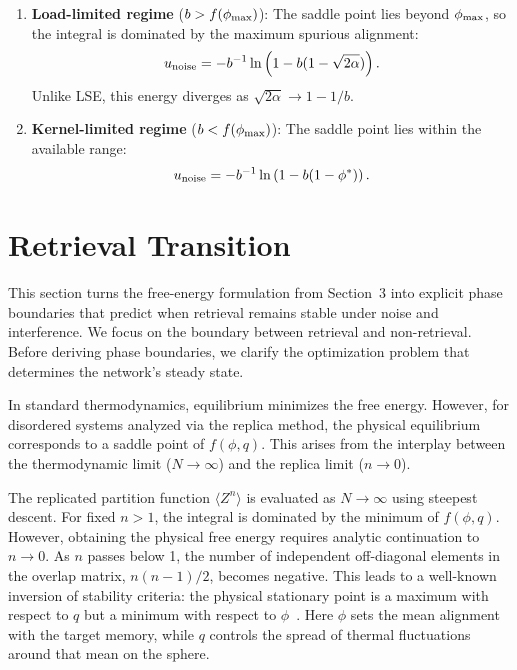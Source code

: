 \documentclass{article}
\theoremstyle{plain}
\theoremstyle{definition}
\theoremstyle{remark}
\begin{document}
\begin{enumerate}
    \item \textbf{Load-limited regime} ($b > f(\phi_{\rm max})$): The saddle point lies beyond $\phi_{\rm max}$, so the integral is dominated by the maximum spurious alignment:
    \begin{equation}
        u_{\rm noise} = -b^{-1} \ln \left( 1 - b(1 - \sqrt{2\alpha}) \right).
    \end{equation}
    Unlike LSE, this energy diverges as $\sqrt{2\alpha} \to 1 - 1/b$.

    \item \textbf{Kernel-limited regime} ($b < f(\phi_{\rm max})$): The saddle point lies within the available range:
    \begin{equation}
        u_{\rm noise} = -b^{-1} \ln \left( 1 - b(1 - \phi^*) \right).
    \end{equation}
\end{enumerate}


\section{Retrieval Transition}\label{sec:transition}

This section turns the free-energy formulation from Section~3 into explicit phase boundaries that predict when retrieval remains stable under noise and interference. We focus on the boundary between retrieval and non-retrieval. Before deriving phase boundaries, we clarify the optimization problem that determines the network's steady state. 

In standard thermodynamics, equilibrium minimizes the free energy. However, for disordered systems analyzed via the replica method, the physical equilibrium corresponds to a saddle point of $f(\phi, q)$. This arises from the interplay between the thermodynamic limit ($N \to \infty$) and the replica limit ($n \to 0$).

The replicated partition function $\langle Z^n \rangle$ is evaluated as $N \to \infty$ using steepest descent. For fixed $n > 1$, the integral is dominated by the minimum of $f(\phi, q)$. However, obtaining the physical free energy requires analytic continuation to $n \to 0$. As $n$ passes below 1, the number of independent off-diagonal elements in the overlap matrix, $n(n-1)/2$, becomes negative. This leads to a well-known inversion of stability criteria: the physical stationary point is a maximum with respect to $q$ but a minimum with respect to $\phi$~\citep{Almeida_1978}. Here $\phi$ sets the mean alignment with the target memory, while $q$ controls the spread of thermal fluctuations around that mean on the sphere.
\end{document}
